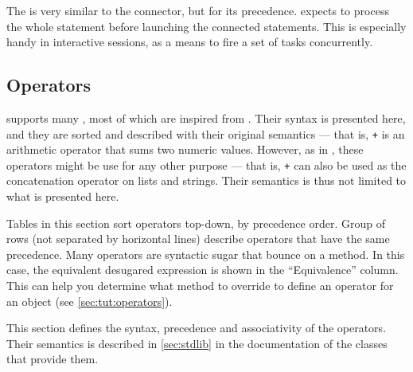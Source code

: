\subsubsection{\samp{\&}}

The \samp{\&} is very similar to the \samp{,} connector, but for its
precedence.  \urbi expects to process the whole statement before
launching the connected statements.   This is especially handy in
interactive sessions, as a means to fire a set of tasks concurrently.


\subsection{Operators}

\us supports many , most of which are inspired from
\Cxx. Their syntax is presented here, and they are sorted and
described with their original semantics --- that is, \lstinline|+| is
an arithmetic operator that sums two numeric values. However, as in
\Cxx, these operators might be use for any other purpose --- that is,
\lstinline|+| can also be used as the concatenation operator on lists
and strings. Their semantics is thus not limited to what is presented
here.

Tables in this section sort operators top-down, by precedence order.
Group of rows (not separated by horizontal lines) describe operators
that have the same precedence. Many operators are syntactic sugar that
bounce on a method. In this case, the equivalent desugared expression
is shown in the ``Equivalence'' column. This can help you determine
what method to override to define an operator for an object (see
\autoref{sec:tut:operators}).

This section defines the syntax, precedence and associativity of the
operators. Their semantics is described in \autoref{sec:stdlib} in the
documentation of the classes that provide them.

\newcommand{\operatorhead}{Operator & Use & Associativity & Original semantic
  & Equivalence\\}


\newcommand{\operator}[6][ ]{\lstinline@#2@&\lstinline@#3@&#4&#5&\lstinline@#6@#1\\}
\newcommand{\boperator}[3]{\operator{#1}{a #1 b}{#2}{#3}{a.'#1'(b)}}
\newcommand{\poperator}[3]{\operator{#1}{#1a}{#2}{#3}{a.'#1'()}}

\newcommand{\operatordot}    {\operator  {.}    {a.b}              {-}     {Message sending}          {Not redefinable}       }
\newcommand{\operatordota}   {\operator  {.}    {a.b(args)}        {-}     {Message sending}          {Not redefinable}       }
\newcommand{\operatorsub}    {\operator  {[]}   {a[args]}          {-}     {Subscript}                {a.'[]'(args)}          }
\newcommand{\operatorsubass} {\operator  {[] =} {a[args] = v}      {-}     {Subscript assignment}     {a.'[]='(args, v)}      }
\newcommand{\operatorass}[2][ ]    {\operator[#1]
                                         {=}    {a = b}            {Right} {Assignment}               {updateSlot("a", b)}    }

